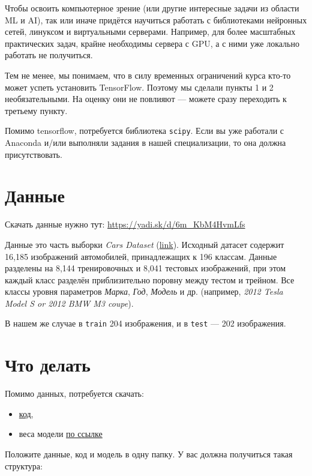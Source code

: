 \documentclass[11pt,a4paper]{article}
\begin{document}
Чтобы освоить компьютерное зрение (или другие интересные задачи из области ML и AI), так или иначе придётся научиться работать с библиотеками нейронных сетей, линуксом и виртуальными серверами. Например, для более масштабных практических задач, крайне необходимы сервера с GPU, а с ними уже локально работать не получиться.

Тем не менее, мы понимаем, что в силу временных ограничений курса кто-то может успеть установить TensorFlow. Поэтому мы сделали пункты 1 и 2 необязательными. На оценку они не повлияют — можете сразу переходить к третьему пункту.

Помимо tensorflow, потребуется библиотека \texttt{scipy}. Если вы уже работали с Anaconda и/или выполняли задания в нашей специализации, то она должна присутствовать.

\section{Данные}

Скачать данные нужно тут: \href{https://yadi.sk/d/6m\_KbM4HvmLfs}{https://yadi.sk/d/6m\_KbM4HvmLfs}

Данные это часть выборки \textit{Cars Dataset} (\href{http://ai.stanford.edu/\textasciitilde{}jkrause/cars/car\_dataset.html}{link}). Исходный датасет содержит 16,185 изображений автомобилей, принадлежащих к 196 классам. Данные разделены на 8,144 тренировочных и 8,041 тестовых изображений, при этом каждый класс разделён приблизительно поровну между тестом и трейном. Все классы уровня параметров \textit{Марка}, \textit{Год}, \textit{Модель} и др. (например, \textit{2012 Tesla Model S or 2012 BMW M3 coupe}).

В нашем же случае в \texttt{train} 204 изображения, и в \texttt{test} — 202 изображения.

\section{Что делать}

Помимо данных, потребуется скачать:

\begin{itemize}
\item \href{https://github.com/ton4eg/coursera\_pa}{код},
\item веса модели \href{https://yadi.sk/d/9-3kXyxRvnBwh}{по ссылке}
\end{itemize}

Положите данные, код и модель в одну папку. У вас должна получиться такая структура:
\end{document}
